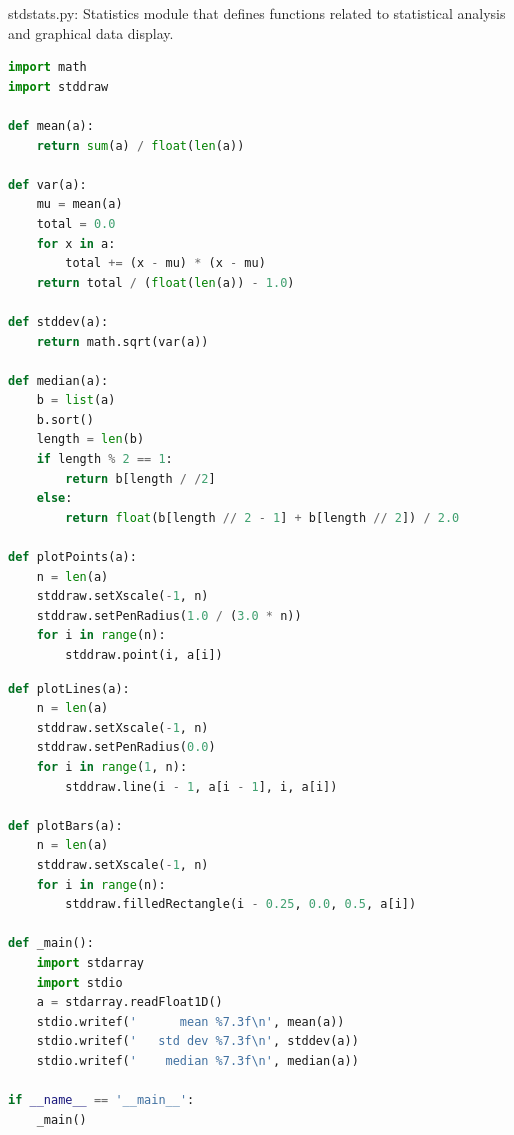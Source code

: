 \documentclass[8pt,a4paper,compress,handout]{beamer}
\begin{document}
\begin{frame}[fragile]
\begin{framed}
\tiny stdstats.py: Statistics module that defines functions related to statistical analysis and graphical data display.
\end{framed}

\begin{lstlisting}[language=Python]
import math
import stddraw

def mean(a):
    return sum(a) / float(len(a))

def var(a):
    mu = mean(a)
    total = 0.0
    for x in a:
        total += (x - mu) * (x - mu)
    return total / (float(len(a)) - 1.0)

def stddev(a):
    return math.sqrt(var(a))

def median(a):
    b = list(a)
    b.sort()
    length = len(b)
    if length % 2 == 1:
        return b[length / /2]
    else:
        return float(b[length // 2 - 1] + b[length // 2]) / 2.0

def plotPoints(a):
    n = len(a)
    stddraw.setXscale(-1, n)
    stddraw.setPenRadius(1.0 / (3.0 * n))
    for i in range(n):
        stddraw.point(i, a[i])
\end{lstlisting}
\end{frame}

\begin{frame}[fragile]
\begin{lstlisting}[language=Python]
def plotLines(a):
    n = len(a)
    stddraw.setXscale(-1, n)
    stddraw.setPenRadius(0.0)
    for i in range(1, n):
        stddraw.line(i - 1, a[i - 1], i, a[i])

def plotBars(a):
    n = len(a)
    stddraw.setXscale(-1, n)
    for i in range(n):
        stddraw.filledRectangle(i - 0.25, 0.0, 0.5, a[i])

def _main():
    import stdarray
    import stdio
    a = stdarray.readFloat1D()
    stdio.writef('      mean %7.3f\n', mean(a))
    stdio.writef('   std dev %7.3f\n', stddev(a))
    stdio.writef('    median %7.3f\n', median(a))

if __name__ == '__main__':
    _main()
\end{lstlisting}
\end{frame}
\end{document}
